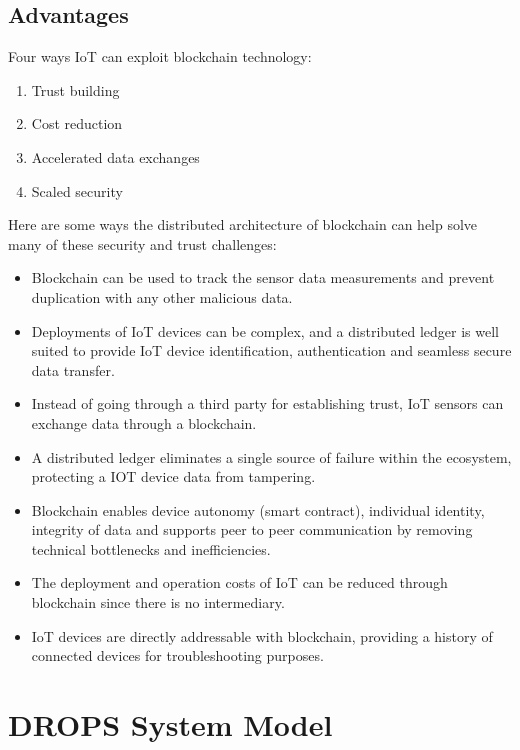 \section{Advantages}
Four ways IoT can exploit blockchain technology:
\begin{enumerate}
\item Trust building
\item Cost reduction
\item Accelerated data exchanges
\item Scaled security
\end{enumerate}
Here are some ways the distributed architecture of blockchain can help solve many of these security and trust challenges:
\begin{itemize}
\item Blockchain can be used to track the sensor data measurements and prevent duplication with any other malicious data.

\item Deployments of IoT devices can be complex, and a distributed ledger is well suited to provide IoT device identification, authentication and seamless secure data transfer.

\item Instead of going through a third party for establishing trust, IoT sensors can exchange data through a blockchain.

\item A distributed ledger eliminates a single source of failure within the ecosystem, protecting a IOT device data from tampering.

\item Blockchain enables device autonomy (smart contract), individual identity, integrity of data and supports peer to peer communication by removing technical bottlenecks and inefficiencies.

\item The deployment and operation costs of IoT can be reduced through blockchain since there is no intermediary.

\item IoT devices are directly addressable with blockchain, providing a history of connected devices for troubleshooting purposes.
\end{itemize}

\chapter{ DROPS System Model}

